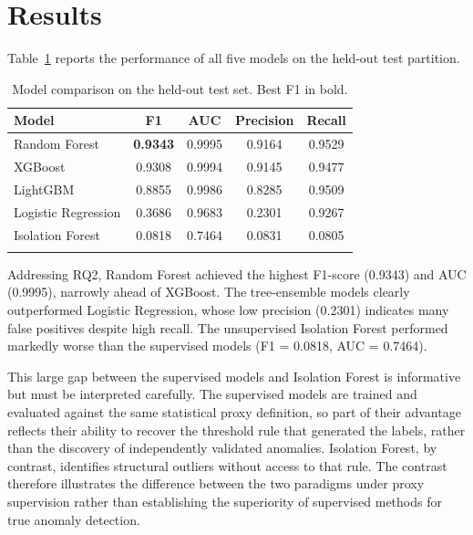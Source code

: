 \documentclass[pdflatex,sn-mathphys-num]{sn-jnl}%
\theoremstyle{thmstyleone}%
\theoremstyle{thmstyletwo}%
\theoremstyle{thmstylethree}%
\begin{document}
\section{Results}\label{sec6}

Table~\ref{tab:results} reports the performance of all five models on the held-out test partition.

\begin{table}[h]
\caption{Model comparison on the held-out test set. Best F1 in bold.}\label{tab:results}%
\begin{tabular}{@{}lcccc@{}}
\toprule
Model & F1 & AUC & Precision & Recall\\
\midrule
Random Forest        & \textbf{0.9343} & 0.9995 & 0.9164 & 0.9529 \\
XGBoost              & 0.9308 & 0.9994 & 0.9145 & 0.9477 \\
LightGBM             & 0.8855 & 0.9986 & 0.8285 & 0.9509 \\
Logistic Regression  & 0.3686 & 0.9683 & 0.2301 & 0.9267 \\
Isolation Forest     & 0.0818 & 0.7464 & 0.0831 & 0.0805 \\
\botrule
\end{tabular}
\end{table}

Addressing RQ2, Random Forest achieved the highest F1-score (0.9343) and AUC (0.9995), narrowly ahead of XGBoost. The tree-ensemble models clearly outperformed Logistic Regression, whose low precision (0.2301) indicates many false positives despite high recall. The unsupervised Isolation Forest performed markedly worse than the supervised models (F1 = 0.0818, AUC = 0.7464).

This large gap between the supervised models and Isolation Forest is informative but must be interpreted carefully. The supervised models are trained and evaluated against the same statistical proxy definition, so part of their advantage reflects their ability to recover the threshold rule that generated the labels, rather than the discovery of independently validated anomalies. Isolation Forest, by contrast, identifies structural outliers without access to that rule. The contrast therefore illustrates the difference between the two paradigms under proxy supervision rather than establishing the superiority of supervised methods for true anomaly detection.
\end{document}
